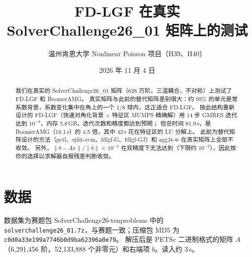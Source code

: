 \documentclass[11pt,a4paper]{ctexart}
\title{FD-LGF 在真实 SolverChallenge26\_01 矩阵上的测试}
\author{温州肯恩大学 \quad Nonlinear Poisson 项目（H39、H40）}
\date{2026 年 11 月 4 日}
\begin{document}
\maketitle

\begin{abstract}
我们在真实的 SolverChallenge26\_01 矩阵（628 万阶，三温耦合，不对称）上测试了 FD-LGF 和 BoomerAMG。
真实矩阵与此前的替代矩阵差别很大：约 95\% 的单元是常系数背景，系数变化集中在角上的一个 1/8 球内，这正适合 FD-LGF。
按此结构重新设计的 FD-LGF（快速对角化背景 + 特征区 MUMPS 精确解）用 14 步 GMRES 迭代达到 $10^{-8}$，内存 5.8\,GB，迭代次数和精度都达到预期；
但总时间 81.9\,s，是 BoomerAMG（18.1\,s）的 4.5 倍，其中 42\,s 花在特征区的 LU 分解上。
此前为替代矩阵设计的方法（pctl、split-sym、fdlgf-G、fdlgf-GJ）和 agg3t-w 在真实矩阵上全部不收敛。
另外，$\|b-Ax\|/\|b\|<10^{-4}$ 在双精度下无法达到（下限约 $10^{-2}$），因此按你的选择以求解器自报残差判断收敛。
\end{abstract}

\section{数据}
数据集为赛题包 SolverChallenge26-tenproblems 中的 \texttt{solverchallenge26\_01.7z}，与赛题一致；压缩包 MD5 为 \texttt{c0d0a33e\allowbreak 199a7746\allowbreak b0d9ba62\allowbreak 396a0e79}。
解压后是 PETSc 二进制格式的矩阵 $A$（6,291,456 阶，52,133,888 个非零元）和右端项 $b$。读入约 3\,s。
\end{document}

